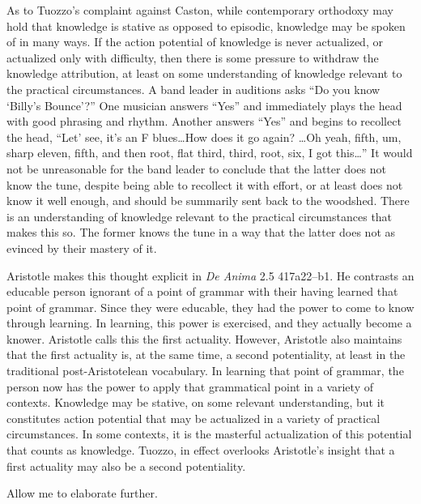 As to Tuozzo's complaint against Caston, while contemporary orthodoxy may hold that knowledge is stative as opposed to episodic, knowledge may be spoken of in many ways. If the action potential of knowledge is never actualized, or actualized only with difficulty, then there is some pressure to withdraw the knowledge attribution, at least on some understanding of knowledge relevant to the practical circumstances. A band leader in auditions asks ``Do you know `Billy's Bounce'?'' One musician answers ``Yes'' and immediately plays the head with good phrasing and rhythm. Another answers ``Yes'' and begins to recollect the head, ``Let' see, it's an F blues\ldots How does it go again? \ldots Oh yeah, fifth, um, sharp eleven, fifth, and then root, flat third, third, root, six, I got this\ldots'' It would not be unreasonable for the band leader to conclude that the latter does not know the tune, despite being able to recollect it with effort, or at least does not know it well enough, and should be summarily sent back to the woodshed. There is an understanding of knowledge relevant to the practical circumstances that makes this so. The former knows the tune in a way that the latter does not as evinced by their mastery of it. 

Aristotle makes this thought explicit in \emph{De Anima} 2.5 417a22–b1. He contrasts an educable person ignorant of a point of grammar with their having learned that point of grammar. Since they were educable, they had the power to come to know through learning. In learning, this power is exercised, and they actually become a knower. Aristotle calls this the first actuality. However, Aristotle also maintains that the first actuality is, at the same time, a second potentiality, at least in the traditional post-Aristotelean vocabulary. In learning that point of grammar, the person now has the power to apply that grammatical point in a variety of contexts. Knowledge may be stative, on some relevant understanding, but it constitutes action potential that may be actualized in a variety of practical circumstances. In some contexts, it is the masterful actualization of this potential that counts as knowledge. Tuozzo, in effect overlooks Aristotle's insight that a first actuality may also be a second potentiality.

Allow me to elaborate further.

